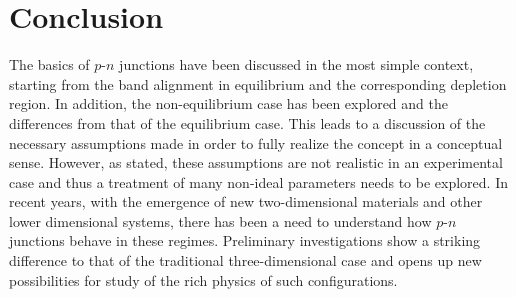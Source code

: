 \documentclass[%
 reprint,
 amsmath,amssymb,
 aps,
pra,
floatfix,
]{revtex4-1}
\begin{document}
\section{Conclusion}\label{sec:conclusion}
The basics of $p$-$n$ junctions have been discussed in the most simple context, starting from the band alignment in equilibrium and the corresponding depletion region.
In addition, the non-equilibrium case has been explored and the differences from that of the equilibrium case. This leads to a discussion of the necessary assumptions 
made in order to fully realize the concept in a conceptual sense. However, as stated, these assumptions are not realistic in an experimental case and thus a treatment 
of many non-ideal parameters needs to be explored. In recent years, with the emergence of new two-dimensional materials and other lower dimensional systems, there has
been a need to understand how $p$-$n$ junctions behave in these regimes. Preliminary investigations show a striking difference to that of the traditional three-dimensional 
case and opens up new possibilities for study of the rich physics of such configurations.



\end{document}

